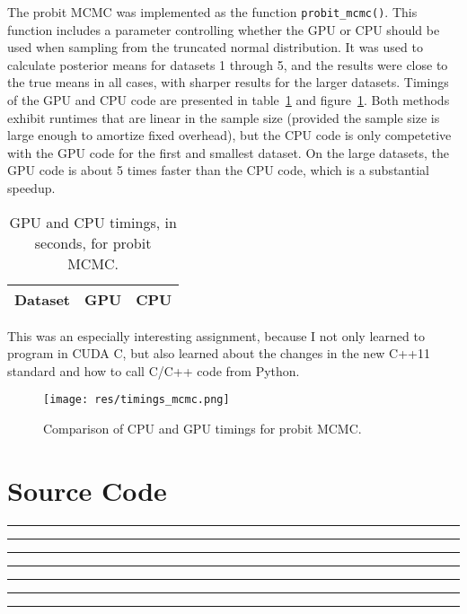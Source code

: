 The probit MCMC was implemented as the function \texttt{probit\_mcmc()}.
This function includes a parameter controlling whether the GPU or CPU should
be used when sampling from the truncated normal distribution.
It was used to calculate posterior means for datasets 1 through 5,
and the results were close to the true means in all cases,
with sharper results for the larger datasets.
Timings of the GPU and CPU code are presented in table~\ref{tab:timings_mcmc}
and figure~\ref{fig:timings_mcmc}.
Both methods exhibit runtimes that are linear in the sample size
(provided the sample size is large enough to amortize fixed overhead),
but the CPU code is only competetive with the GPU code for the first
and smallest dataset.
On the large datasets, the GPU code is about 5 times faster
than the CPU code, which is a substantial speedup.

    \begin{table}[h]
    \begin{tabular}{lrr}
    \toprule
    Dataset & GPU & CPU \\
    \midrule
    
    \bottomrule
    \end{tabular}
    \caption{
        GPU and CPU timings, in seconds, for probit MCMC.
    }
    \label{tab:timings_mcmc}
    \end{table}

This was an especially interesting assignment,
because I not only learned to program in CUDA C,
but also learned about the changes in the new C++11 standard
and how to call C/C++ code from Python.

    \begin{figure}[p]
    \texttt{[image: res/timings\_mcmc.png]}
    \caption{
        Comparison of CPU and GPU timings for probit MCMC.
    }
    \label{fig:timings_mcmc}
    \end{figure}

\clearpage
\chapter*{Source Code}
\hrule

\hrule

\hrule

\hrule

\hrule

\hrule

\hrule



